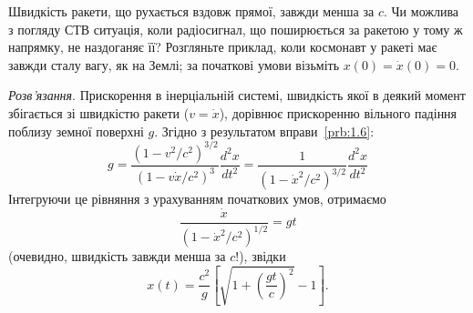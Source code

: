 \begin{problem}
Швидкість ракети, що рухається вздовж прямої, завжди менша за $c$. Чи можлива з погляду СТВ ситуація, коли радіосигнал,
що поширюється за ракетою у тому ж напрямку, не наздоганяє її? Розгляньте приклад, коли космонавт у ракеті має завжди
сталу вагу, як на Землі; за початкові умови візьміть $x(0) = \dot{x}(0) = 0$.

\emph{Розв'язання}. Прискорення в інерціальній системі, швидкість якої в деякий момент збігається зі швидкістю ракети
($v = \dot{x}$), дорівнює прискоренню вільного падіння поблизу земної поверхні $g$. Згідно з результатом
вправи~\ref{prb:1.6}:
\[
g = \frac{(1 - v^{2}/c^{2})^{3/2}}{(1 - v\dot{x}/c^{2})^{3}}\frac{d^{2}x}{dt^{2}}
= \frac{1}{(1 - \dot{x}^{2}/c^{2})^{3/2}}\frac{d^{2}x}{dt^{2}}
\]
Інтегруючи це рівняння з урахуванням початкових умов, отримаємо
\[
\frac{\dot{x}}{(1 - \dot{x}^{2}/c^{2})^{1/2}} = gt
\]
(очевидно, швидкість завжди менша за $c$!), звідки
\[
x(t) = \frac{c^{2}}{g}\left[ \sqrt{1 + \left( \frac{gt}{c} \right)^{2}} - 1 \right].
\]

\begin{center}
\end{center}
\end{problem}
